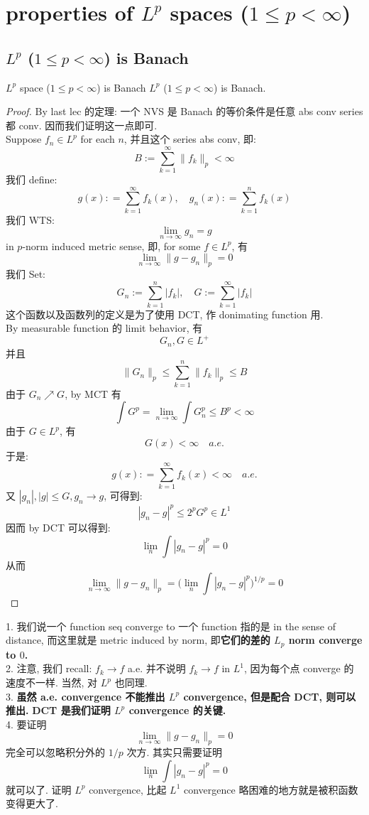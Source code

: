\documentclass[lang=cn,11pt]{elegantbook}
\begin{document}
\section{properties of $L^p$ spaces ($1\leq p < \infty$)}
\subsection{$L^p$ ($1\leq p < \infty$) is Banach}
\begin{theorem}{$L^p$ space ($1\leq p < \infty$) is Banach}
    $L^p$ ($1\leq p < \infty$) is Banach.
\end{theorem}
\begin{proof}
    By last lec 的定理: 一个 NVS 是 Banach 的等价条件是任意 abs conv series 都 conv. 因而我们证明这一点即可.\\
Suppose $f_n \in L^p$ for each $n$, 并且这个 series abs conv, 即: \[
B := \sum_{k=1}^\infty \| f_k \|_p < \infty
\]
我们 define: \[
g(x) : = \sum_{k=1}^\infty f_k(x),\quad g_n(x) : = \sum_{k=1}^n f_k(x)
\]
我们 WTS: \[
\lim_{n\to\infty} g_n = g
\]
in $p$-norm induced metric sense, 即, for some $f \in L^p$, 有 \[
\lim_{n\to\infty} \big\|  g - g_n \big \|_p = 0
\]
我们 Set: \[
G_n := \sum_{k=1}^n |f_k|,\quad G:= \sum_{k=1}^\infty |f_k|
\]
这个函数以及函数列的定义是为了使用 DCT, 作 donimating function 用. \\
By measurable function 的 limit behavior, 有 \[
G_n,G\in L^+
\]
并且 \[
\|G_n\|_p \leq \sum_{k=1}^n \|f_k\|_p \leq B
\]
由于 $G_n \nearrow G$, by MCT 有 \[
\int G^p = \lim_{n\to \infty} \int G_n^p \leq B^p < \infty
\] 由于 $G\in L^p$, 有 $$G(x) < \infty \quad a.e.$$ 于是: \[
g(x) : = \sum_{k=1}^\infty f_k(x) <\infty \quad a.e.
\]
又 $|g_n|,|g|\leq G, g_n \to g$, 可得到: \[
|g_n - g|^p \leq 2^p G^p \in L^1
\] 因而 by DCT 可以得到: \[
\lim _n\int |g_n - g|^p    = 0
\]
从而\[
  \lim_{n\to\infty} \big\|  g - g_n \big \|_p = \bigg( \lim _n\int |g_n - g|^p   \bigg)^{1/p} = 0
\]
\end{proof}
\begin{remark}
1. 我们说一个 function seq converge to 一个 function 指的是 in the sense of distance, 而这里就是 metric induced by norm, 即\textbf{它们的差的 $L_p$ norm converge to $0$.}\\
2. 注意, 我们 recall: $f_k \to f$ a.e. 并不说明 $f_k\to f$ in $L^1$, 因为每个点 converge 的速度不一样. 当然, 对 $L^p$ 也同理.\\
3. \textbf{虽然 a.e. convergence 不能推出 $L^p$ convergence, 但是配合 DCT, 则可以推出.} \textbf{DCT 是我们证明 $L^p$ convergence 的关键.}\\
4. 要证明 \[
  \lim_{n\to\infty} \big\|  g - g_n \big \|_p = 0
\]完全可以忽略积分外的 $1/p$ 次方. 其实只需要证明 \[
\lim _n\int |g_n - g|^p    = 0 
\] 就可以了. 证明 $L^p$ convergence, 比起 $L^1$ convergence 略困难的地方就是被积函数变得更大了.
\end{remark}
\end{document}
